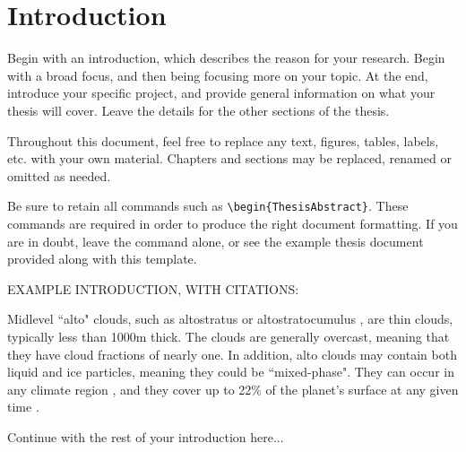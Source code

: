 \documentclass[master]{UWMThesis}
\begin{document}

\chapter{Introduction} \label{sec:intro}

Begin with an introduction, which describes the reason for your research.  Begin with a broad focus, and then being focusing more on your topic.  At the end, introduce your specific project, and provide general information on what your thesis will cover.  Leave the details for the other sections of the thesis.

Throughout this document, feel free to replace any text, figures, tables, labels, etc. with your own material.  Chapters and sections may be replaced, renamed or omitted as needed.

Be sure to retain all commands such as \verb=\begin{ThesisAbstract}=.  These commands are required in order to produce the right document formatting.  If you are in doubt, leave the command alone, or see the example thesis document provided along with this template.

EXAMPLE INTRODUCTION, WITH CITATIONS:

Midlevel ``alto" clouds, such as altostratus or altostratocumulus \citep{larson_et_al_06a}, are thin clouds, typically less than 1000m thick.  The clouds are generally overcast, meaning that they have cloud fractions of nearly one.  In addition, alto clouds may contain both liquid and ice particles, meaning they could be ``mixed-phase".  They can occur in any climate region \citep{sassen_khvorostyanov_07a}, and they cover up to 22\% of the planet's surface at any given time \citep{warren_et_al_88a,warren_et_al_88b}.

Continue with the rest of your introduction here...


\end{document}

